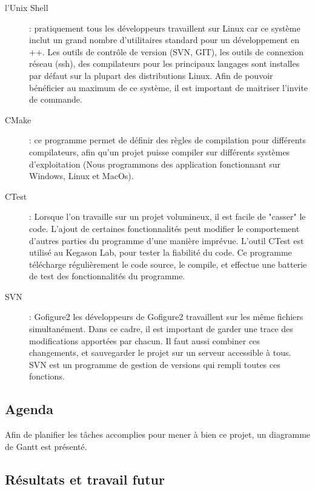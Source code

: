\begin{description}
  \item[l'Unix Shell] : pratiquement tous les développeurs travaillent sur Linux car ce système inclut un grand nombre d'utilitaires
  standard pour un développement en {\C++}. Les outils de contrôle de version (SVN, GIT), les outils de connexion réseau (ssh), des
  compilateurs pour les principaux langages sont installes par défaut sur la plupart des distributions Linux.
  Afin de pouvoir bénéficier au maximum de ce système, il est important de maitriser l'invite de commande.
  \item[CMake] : ce programme permet de définir des règles de compilation pour différents compilateurs, afin qu'un projet puisse
   compiler sur différents systèmes d'exploitation (Nous programmons des application fonctionnant sur Windows, Linux et MacOs).
  \item[CTest] : Lorsque l'on travaille sur un projet volumineux, il est facile de "casser" le code. L'ajout de certaines fonctionnalités 
  peut modifier le comportement d'autres parties du programme d'une manière imprévue. L'outil CTest est utilisé au Kegason Lab, 
  pour tester la fiabilité du code. Ce programme télécharge régulièrement le code source, le compile, et effectue une batterie de test 
  des fonctionnalités du programme.
  \item[SVN] : Gofigure2 les développeurs de Gofigure2 travaillent sur les même fichiers simultanément. 
  Dans ce cadre, il est important de garder une trace des modifications apportées par chacun. Il faut aussi combiner ces changements, 
  et sauvegarder le projet sur un serveur accessible à tous. SVN est un programme de gestion de versions qui rempli toutes ces 
  fonctions.
\end{description}


\subsection{Agenda}

Afin de planifier les tâches accomplies pour mener à bien ce projet, un diagramme de Gantt est présenté.

\subsection{Résultats et travail futur}

